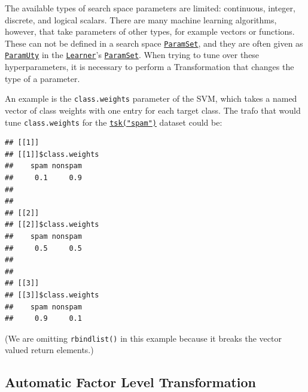 \documentclass[
]{scrbook}
\newenvironment{Shaded}{\begin{snugshade}}{\end{snugshade}}
\newcommand{\AttributeTok}[1]{\textcolor[rgb]{0.77,0.63,0.00}{#1}}
\newcommand{\ControlFlowTok}[1]{\textcolor[rgb]{0.13,0.29,0.53}{\textbf{#1}}}
\newcommand{\DecValTok}[1]{\textcolor[rgb]{0.00,0.00,0.81}{#1}}
\newcommand{\FloatTok}[1]{\textcolor[rgb]{0.00,0.00,0.81}{#1}}
\newcommand{\FunctionTok}[1]{\textcolor[rgb]{0.00,0.00,0.00}{#1}}
\newcommand{\NormalTok}[1]{#1}
\newcommand{\OtherTok}[1]{\textcolor[rgb]{0.56,0.35,0.01}{#1}}
\newcommand{\SpecialCharTok}[1]{\textcolor[rgb]{0.00,0.00,0.00}{#1}}
\renewenvironment{Shaded} {\begin{snugshade}\small} {\end{snugshade}}
\begin{document}
The available types of search space parameters are limited: continuous, integer, discrete, and logical scalars.
There are many machine learning algorithms, however, that take parameters of other types, for example vectors or functions.
These can not be defined in a search space \href{https://paradox.mlr-org.com/reference/ParamSet.html}{\texttt{ParamSet}}, and they are often given as \href{https://paradox.mlr-org.com/reference/ParamUty.html}{\texttt{ParamUty}} in the \href{https://mlr3.mlr-org.com/reference/Learner.html}{\texttt{Learner}}'s \href{https://paradox.mlr-org.com/reference/ParamSet.html}{\texttt{ParamSet}}.
When trying to tune over these hyperparameters, it is necessary to perform a Transformation that changes the type of a parameter.

An example is the \texttt{class.weights} parameter of the SVM, which takes a named vector of class weights with one entry for each target class.
The trafo that would tune \texttt{class.weights} for the \href{https://mlr3.mlr-org.com/reference/mlr_tasks_spam.html}{\texttt{tsk("spam")}} dataset could be:

\begin{Shaded}
\end{Shaded}

\begin{verbatim}
## [[1]]
## [[1]]$class.weights
##    spam nonspam 
##     0.1     0.9 
## 
## 
## [[2]]
## [[2]]$class.weights
##    spam nonspam 
##     0.5     0.5 
## 
## 
## [[3]]
## [[3]]$class.weights
##    spam nonspam 
##     0.9     0.1
\end{verbatim}

(We are omitting \texttt{rbindlist()} in this example because it breaks the vector valued return elements.)

\hypertarget{autolevel}{%
\subsection{Automatic Factor Level Transformation}\label{autolevel}}
\end{document}
